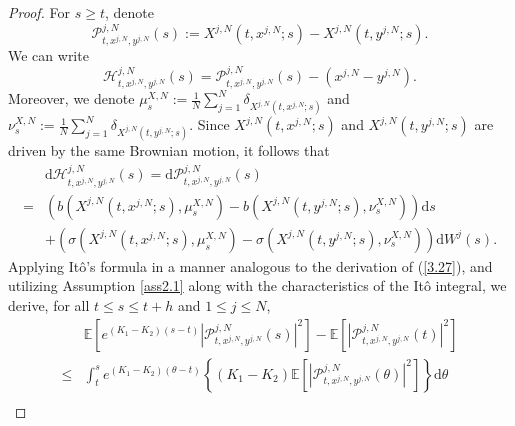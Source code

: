 \documentclass[12pt]{article}
\numberwithin{equation}{section}
\begin{document}
\begin{proof}  For $s \geq t$,  denote  \begin{equation}\tag{5.27}\label{4.8}
\mathcal{P}^{j,N}_{t, x^{j,N}, y^{j,N}}\left(s\right):=X^{j,N}\left(t, x^{j,N} ; s\right)-X^{j,N}\left(t,y^{j,N} ; s\right).
\end{equation}
We can write 
\begin{equation}\tag{5.28}\label{4.9}
\mathcal{H}^{j,N}_{t, x^{j,N}, y^{j,N}}\left(s\right)=\mathcal{P}^{j,N}_{t, x^{j,N}, y^{j,N}}\left(s\right)-\left(x^{j,N}-y^{j,N}\right).
\end{equation}
 Moreover, we denote $\mu _{s}^{X,N}:=\tfrac{1}{N}\sum_{j=1}^N{\delta _{X^{j,N}\left(t,x^{j,N};s\right)}}$ and $\nu _{s}^{X,N}:=\tfrac{1}{N}\sum_{j=1}^N{\delta _{X^{j,N}\left(t,y^{j,N};s\right)}}$. Since $X^{j,N}\left(t, x^{j,N} ; s\right)$ and $X^{j,N}\left(t, y^{j,N} ; s\right)$ are driven by the same Brownian motion, it follows that
\begin{equation}\tag{5.29}\label{4.10}
\begin{aligned}
&\mathrm{d} \mathcal{H}^{j,N}_{t, x^{j,N}, y^{j,N}}\left(s\right)=\mathrm{d} \mathcal{P}^{j,N}_{t, x^{j,N}, y^{j,N}}\left(s\right)\\
=&\left(b\left(X^{j,N}\left(t, x^{j,N} ; s\right), \mu _{s}^{X,N}\right)-b\left(X^{j,N}\left(t, y^{j,N} ; s\right), \nu _{s}^{X,N}\right)\right) \mathrm{d} s\\
&+\left(\sigma\left(X^{j,N}\left(t, x^{j,N} ; s\right), \mu _{s}^{X,N}\right)-\sigma\left(X^{j,N}\left(t, y^{j,N} ; s\right), \nu _{s}^{X,N}\right)\right) \mathrm{d} W^{j}\left(s\right).
\end{aligned}
\end{equation}
   Applying It{\^o}'s formula in a manner analogous to the derivation of (\ref{3.27}), and utilizing Assumption \ref{ass2.1} along with the characteristics of the It{\^o} integral, we derive, for all $t \leq s \leq t+h$  and $1\leq j\leq N$,
\begin{equation}\tag{5.30}\label{4.12}
\begin{aligned}
& \mathbb{E}\left[e^{\left(K_1-K_2\right)\left(s-t\right)}\left|\mathcal{P}^{j,N}_{t, x^{j,N}, y^{j,N}}\left(s\right)\right|^{2}\right]-\mathbb{E}\left[\left|\mathcal{P}^{j,N}_{t, x^{j,N}, y^{j,N}}\left(t\right)\right|^{2}\right] \\
\leq & \int_t^s  e^{\left(K_1-K_2\right)\left(\theta-t\right)}\left\{\left(K_1-K_2\right)\mathbb{E}\left[\left|\mathcal{P}^{j,N}_{t, x^{j,N}, y^{j,N}}\left(\theta\right)\right|^{2}\right]\right\}\mathrm{d} \theta\\ 

\end{aligned}
\end{equation}
\end{proof}
\end{document}
